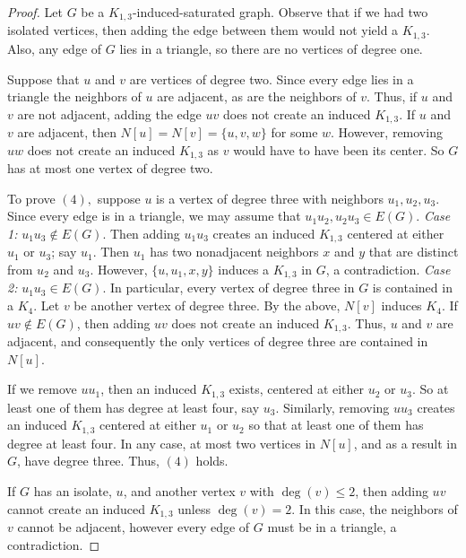 \documentclass[12pt]{amsart}
\theoremstyle{plain}
\theoremstyle{definition}
\theoremstyle{remark}
\newcommand{\claw}{\ensuremath{K_{1,3}}\xspace}
\begin{document}
\begin{proof}
Let $G$ be a \claw-induced-saturated graph.  Observe that if we had two isolated vertices, then adding the edge between them would not yield a $K_{1,3}$. Also, any edge of $G$ lies in a triangle, so there are no vertices of degree one.

Suppose that $u$ and $v$ are vertices of degree two. Since every edge lies in a triangle the neighbors of $u$ are adjacent, as are the neighbors of $v$.  Thus, if $u$ and $v$ are not adjacent, adding the edge $uv$ does not create an induced \claw.  If $u$ and $v$ are adjacent, then $N[u] = N[v] = \{u,v,w\}$ for some $w$.  However, removing $uw$ does not create an induced \claw as $v$ would have to have been its center.  So $G$ has at most one vertex of degree two.

To prove $(4),$ suppose $u$ is a vertex of degree three with neighbors $u_1,u_2,u_3$.  Since every edge is in a triangle, we may assume that $u_1u_2, u_2u_3 \in E(G)$.
\textit{Case 1:} $u_1u_3 \notin E(G)$. Then adding $u_1u_3$ creates an induced \claw centered at either $u_1$ or $u_3$; say $u_1$.  Then $u_1$ has two nonadjacent neighbors $x$ and $y$ that are distinct from $u_2$ and $u_3$.  However, $\{u,u_1,x,y\}$ induces a \claw in $G$, a contradiction.  \textit{Case 2:} $u_1u_3 \in E(G)$. In particular, every vertex of degree three in $G$ is contained in a $K_4$.  Let $v$ be another vertex of degree three.  By the above, $N[v]$ induces $K_4$.  If $uv \notin E(G)$, then adding $uv$ does not create an induced \claw.  Thus, $u$ and $v$ are adjacent, and consequently the only vertices of degree three are contained in $N[u]$.

If we remove $uu_1$, then an induced \claw exists, centered at either $u_2$ or $u_3$.   So at least one of them has degree at least four, say $u_3$.  Similarly, removing $uu_3$ creates an induced \claw centered at either $u_1$ or $u_2$ so that at least one of them has degree at least four.  In any case, at most two vertices in $N[u]$, and as a result in $G$, have degree three. Thus, $(4)$ holds.

If $G$ has an isolate, $u$, and another vertex $v$ with $\deg(v) \le 2$, then adding $uv$ cannot create an induced \claw unless $\deg(v) = 2$.  In this case, the neighbors of $v$ cannot be adjacent, however every edge of $G$ must be in a triangle, a contradiction.

\end{proof}
\end{document}
